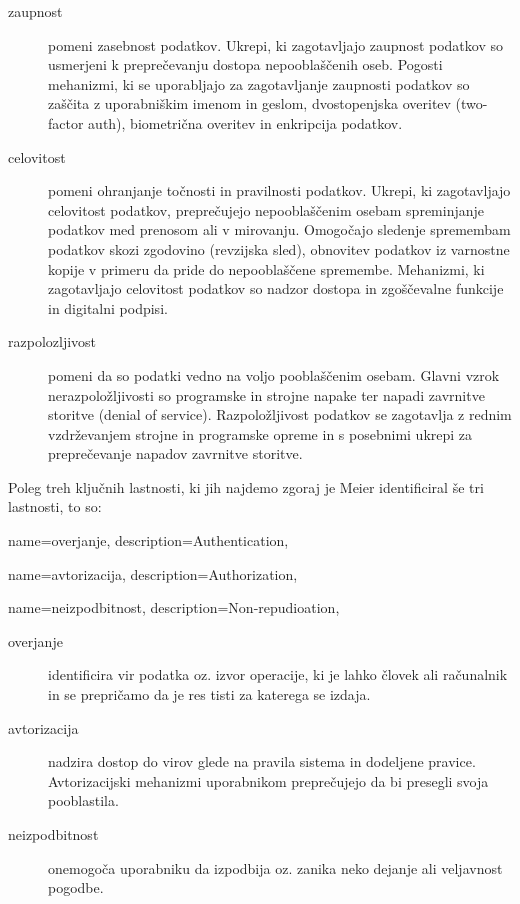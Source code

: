 \documentclass[12pt,a4paper,openany]{book}
\begin{document}
\begin{description}
\item[\Gls{zaupnost}] pomeni zasebnost podatkov. Ukrepi, ki zagotavljajo zaupnost podatkov so usmerjeni k preprečevanju dostopa nepooblaščenih oseb. Pogosti mehanizmi, ki se uporabljajo za zagotavljanje zaupnosti podatkov so zaščita z uporabniškim imenom in geslom, dvostopenjska overitev (two-factor auth), biometrična overitev in enkripcija podatkov.

\item[\Gls{celovitost}] pomeni ohranjanje točnosti in pravilnosti podatkov. Ukrepi, ki zagotavljajo celovitost podatkov, preprečujejo nepooblaščenim osebam spreminjanje podatkov med prenosom ali v mirovanju. Omogočajo sledenje spremembam podatkov skozi zgodovino (revzijska sled), obnovitev podatkov iz varnostne kopije v primeru da pride do nepooblaščene spremembe. Mehanizmi, ki zagotavljajo celovitost podatkov so nadzor dostopa in zgoščevalne funkcije in digitalni podpisi.

\item[\Gls{razpolozljivost}] pomeni da so podatki vedno na voljo pooblaščenim osebam. Glavni vzrok nerazpoložljivosti so programske in strojne napake ter napadi zavrnitve storitve (denial of service). Razpoložljivost podatkov se zagotavlja z rednim vzdrževanjem strojne in programske opreme in s posebnimi ukrepi za preprečevanje napadov zavrnitve storitve.

\end{description}

Poleg treh ključnih lastnosti, ki jih najdemo zgoraj je Meier identificiral še tri lastnosti, to so:

{
  name=overjanje,
  description={Authentication},
}

{
  name=avtorizacija,
  description={Authorization},
}

{
  name=neizpodbitnost,
  description={Non-repudioation},
}

\begin{description}

\item[\Gls{overjanje}] identificira vir podatka oz. izvor operacije, ki je lahko človek ali računalnik in se prepričamo da je res tisti za katerega se izdaja.

\item[\Gls{avtorizacija}] nadzira dostop do virov glede na pravila sistema in dodeljene pravice. Avtorizacijski mehanizmi uporabnikom preprečujejo da bi presegli svoja pooblastila.

\item[\Gls{neizpodbitnost}] onemogoča uporabniku da izpodbija oz. zanika neko dejanje ali veljavnost pogodbe.

\end{description}
\end{document}
